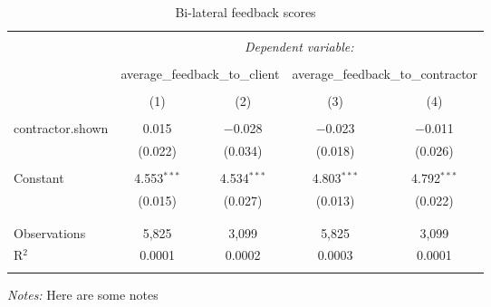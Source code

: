 
\begin{table}[!htbp] \centering 
  \caption{Bi-lateral feedback scores} 
  \label{tab:feedback} 
\begin{tabular}{@{\extracolsep{5pt}}lcccc} 
\\[-1.8ex]\hline 
\hline \\[-1.8ex] 
 & \multicolumn{4}{c}{\textit{Dependent variable:}} \\ 
\cline{2-5} 
\\[-1.8ex] & \multicolumn{2}{c}{average\_feedback\_to\_client} & \multicolumn{2}{c}{average\_feedback\_to\_contractor} \\ 
\\[-1.8ex] & (1) & (2) & (3) & (4)\\ 
\hline \\[-1.8ex] 
 contractor.shown & 0.015 & $-$0.028 & $-$0.023 & $-$0.011 \\ 
  & (0.022) & (0.034) & (0.018) & (0.026) \\ 
  & & & & \\ 
 Constant & 4.553$^{***}$ & 4.534$^{***}$ & 4.803$^{***}$ & 4.792$^{***}$ \\ 
  & (0.015) & (0.027) & (0.013) & (0.022) \\ 
  & & & & \\ 
\hline \\[-1.8ex] 
Observations & 5,825 & 3,099 & 5,825 & 3,099 \\ 
R$^{2}$ & 0.0001 & 0.0002 & 0.0003 & 0.0001 \\ 
\hline 
\hline \\[-1.8ex] 
\end{tabular}
\begin{minipage}{0.9\textwidth} 
 \emph{Notes:} Here are some notes
 \end{minipage}
\end{table}
